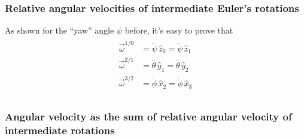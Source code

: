 \documentclass[letterpaper,10pt,english]{jupyterBook}
\begin{document}
\subsubsection*{Relative angular velocities of intermediate Euler’s rotations}

\sphinxAtStartPar
As shown for the “yaw” angle \(\psi\) before, it’s easy to prove that
\begin{equation*}
\begin{split}\begin{aligned}
  \vec{\omega}^{1/0} & = \dot{\psi}  \, \hat{z}_0  =  \dot{\psi}  \, \hat{z}_1 \\ 
  \vec{\omega}^{2/1} & = \dot{\theta}\, \hat{y}_1  =  \dot{\theta}\, \hat{y}_2 \\ 
  \vec{\omega}^{3/2} & = \dot{\phi}  \, \hat{x}_2  =  \dot{\phi}  \, \hat{x}_3 \\ 
\end{aligned}\end{split}
\end{equation*}\subsubsection*{Angular velocity as the sum of relative angular velocity of intermediate rotations}
\end{document}
